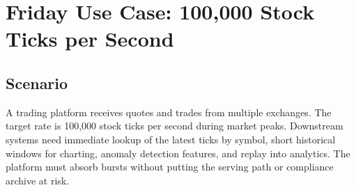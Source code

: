 \section{Friday Use Case: 100,000 Stock Ticks per Second}

\subsection{Scenario}
A trading platform receives quotes and trades from multiple exchanges. The target rate is 100,000 stock ticks per second during market peaks. Downstream systems need immediate lookup of the latest ticks by symbol, short historical windows for charting, anomaly detection features, and replay into analytics. The platform must absorb bursts without putting the serving path or compliance archive at risk.

